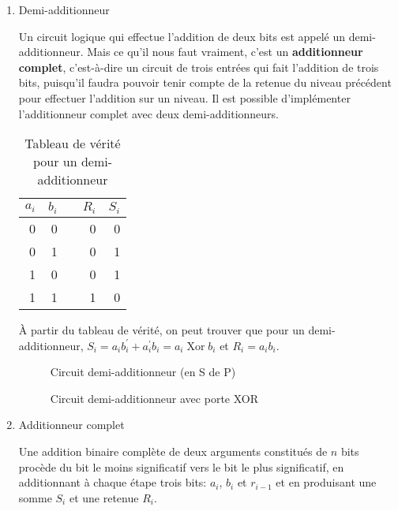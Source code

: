 \documentclass[letter, oneside]{book}
\begin{document}
\begin{enumerate}
\item Demi-additionneur
\label{sec:orgb5cf9f8}

Un circuit logique qui effectue l'addition de deux bits est appelé un
demi-additionneur. Mais ce qu'il nous faut vraiment, c'est un
\textbf{additionneur complet}, c'est-à-dire un circuit de trois entrées qui
fait l'addition de trois bits, puisqu'il faudra pouvoir tenir compte
de la retenue du niveau précédent pour effectuer l'addition sur un
niveau. Il est possible d'implémenter l'additionneur complet avec deux
demi-additionneurs.

\begin{table}[htbp]
\caption{\label{tab:org7a87f4c}Tableau de vérité pour un demi-additionneur}
\centering
\begin{tabular}{rrlrr}
\(a_{i}\) & \(b_{i}\) &  & \(R_{i}\) & \(S_{i}\)\\[0pt]
\hline
0 & 0 &  & 0 & 0\\[0pt]
0 & 1 &  & 0 & 1\\[0pt]
1 & 0 &  & 0 & 1\\[0pt]
1 & 1 &  & 1 & 0\\[0pt]
\end{tabular}
\end{table}


À partir du tableau de vérité, on peut trouver que pour un
demi-additionneur, \(S_{i} = a_i b_i^\prime + a_i^\prime b_i = a_i
\operatorname{Xor} b_i\) et \(R_{i} = a_i b_i\).

\begin{figure}[htbp]
\centering

\caption{\label{fig:org0d4bbbb}Circuit demi-additionneur (en S de P)}
\end{figure}


\begin{figure}[htbp]
\centering

\caption{\label{fig:orgae2313e}Circuit demi-additionneur avec porte XOR}
\end{figure}

\item Additionneur complet
\label{sec:orge5bfbcc}

Une addition binaire complète de deux arguments constitués de \(n\)
bits procède du bit le moins significatif vers le bit le plus
significatif, en additionnant à chaque étape trois bits: \(a_{i}\),
\(b_{i}\) et \(r_{i-1}\) et en produisant une somme \(S_{i}\) et une
retenue \(R_{i}\).



\end{enumerate}
\end{document}
